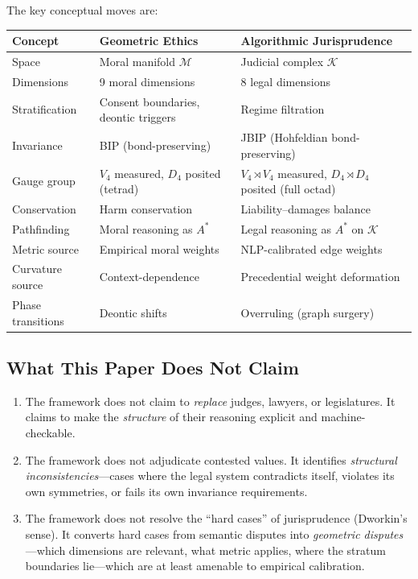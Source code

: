 \documentclass[12pt]{article}
\theoremstyle{definition}
\theoremstyle{remark}
\newcommand{\M}{\mathcal{M}}               %
\begin{document}
The key conceptual moves are:

\begin{center}
\begin{tabular}{lll}
\toprule
\textbf{Concept} & \textbf{Geometric Ethics} & \textbf{Algorithmic Jurisprudence} \\
\midrule
Space & Moral manifold $\M$ & Judicial complex $\mathcal{K}$ \\
Dimensions & 9 moral dimensions & 8 legal dimensions \\
Stratification & Consent boundaries, deontic triggers & Regime filtration \\
Invariance & BIP (bond-preserving) & JBIP (Hohfeldian bond-preserving) \\
Gauge group & $V_4$ measured, $D_4$ posited (tetrad) & $V_4 \rtimes V_4$ measured, $D_4 \rtimes D_4$ posited (full octad) \\
Conservation & Harm conservation & Liability--damages balance \\
Pathfinding & Moral reasoning as $A^*$ & Legal reasoning as $A^*$ on $\mathcal{K}$ \\
Metric source & Empirical moral weights & NLP-calibrated edge weights \\
Curvature source & Context-dependence & Precedential weight deformation \\
Phase transitions & Deontic shifts & Overruling (graph surgery) \\
\bottomrule
\end{tabular}
\end{center}

\subsection{What This Paper Does Not Claim}

\begin{enumerate}
    \item The framework does not claim to \emph{replace} judges, lawyers, or legislatures.  It claims to make the \emph{structure} of their reasoning explicit and machine-checkable.
    \item The framework does not adjudicate contested values.  It identifies \emph{structural inconsistencies}---cases where the legal system contradicts itself, violates its own symmetries, or fails its own invariance requirements.
    \item The framework does not resolve the ``hard cases'' of jurisprudence (Dworkin's sense).  It converts hard cases from semantic disputes into \emph{geometric disputes}---which dimensions are relevant, what metric applies, where the stratum boundaries lie---which are at least amenable to empirical calibration.
\end{enumerate}
\end{document}
